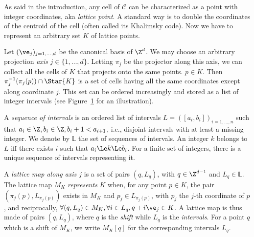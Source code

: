 As said in the introduction, any cell of $\mathcal{C}$ can be
characterized as a point with integer coordinates, aka \emph{lattice
point}. A standard way is to double the coordinates of
the centroid of the cell (often called its Khalimsky code). Now we
have to represent an arbitrary set $K$ of lattice points.

Let $(\ve_j)_{j=1,\dots,d}$ be the canonical basis of $\Z^d$. We may
choose an arbitrary projection \emph{axis} $j \in
\{1,\ldots,d\}$. Letting $\pi_j$ be the projector along this axis, we
can collect all the cells of $K$ that projects onto the same
points.  $p \in K$. Then $\pi^{-1}_j( \pi_j(p)) \cap \Star{K}$ is a set of cells having
all the same coordinates except along coordinate $j$. This set can be
ordered increasingly and stored as a list of integer intervals (see
Figure~\ref{fig:lattice-representation} for an illustration).

\begin{figure}[t]
    \centering
    
    \caption{\label{fig:lattice-representation} }
\end{figure}


A \emph{sequence of intervals} is an ordered list of intervals $L =
([a_i,b_i])_{i=1,\ldots,n}$ such that $a_i \in \Z, b_i \in \Z, b_i + 1
< a_{i+1}$, i.e., disjoint intervals with at least a missing
integer. We denote by $\mathbb{L}$ the set of sequences of
intervals. An integer $k$ belongs to $L$ iff there exists $i$ such that
$a_i \Le k \Le b_i$. For a finite set of integers, there is a unique
sequence of intervals representing it.

A \emph{lattice map along axis $j$} is a set of pairs $(q,L_q)$, with
$q \in \Z^{d-1}$ and $L_q \in \mathbb{L}$. The lattice map $M_K$
\emph{represents} $K$ when, for any point $p \in K$, the pair
$(\pi_j(p), L_{\pi_j(p)})$ exists in $M_K$ and $p_j \in L_{\pi_j(p)}$,
with $p_j$ the $j$-th coordinate of $p$, and reciprocally, $\forall
(q,L_q) \in M_K, \forall i \in L_q, q+i\ve_j \in K$. A lattice map is
thus made of pairs $(q,L_q)$, where $q$ is the \emph{shift} while
$L_q$ is the \emph{intervals}. For a point $q$ which is a shift of
$M_K$, we write $M_K[q]$ for the corresponding intervals $L_q$.

